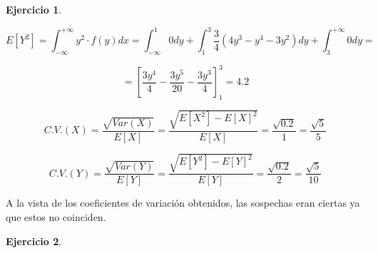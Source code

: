 \documentclass[a4paper, 12pt]{article}
\theoremstyle{definition}
\newtheorem{ej}{Ejercicio}
\begin{document}
\begin{ej}
\begin{enumerate}
    \begin{equation*}
        E[Y^2] = \int_{-\infty}^{+\infty}y^2 \cdot f(y)dx = \int_{-\infty}^{1}0dy + \int_{1}^{3}\frac{3}{4} (4y^3-y^4-3y^2)dy + \int_{3}^{+\infty}0dy =
    \end{equation*}
    
    \begin{equation*}
        = \left[\frac{3y^4}{4}-\frac{3y^5}{20}-\frac{3y^3}{4}\right]^{3}_{1} = 4.2
    \end{equation*}
    
    \begin{equation*}
        C.V.(X)=\frac{\sqrt{Var(X)}}{E[X]} = \frac{\sqrt{E[X^2]-E[X]^2}}{E[X]} = \frac{\sqrt{0.2}}{1} = \frac{\sqrt{5}}{5}
    \end{equation*}
    
    \begin{equation*}
        C.V.(Y)=\frac{\sqrt{Var(Y)}}{E[Y]} = \frac{\sqrt{E[Y^2]-E[Y]^2}}{E[Y]} = \frac{\sqrt{0.2}}{2} = \frac{\sqrt{5}}{10}
    \end{equation*}

A la vista de los coeficientes de variación obtenidos, las sospechas eran ciertas ya que estos no coinciden.
\end{enumerate}
\end{ej}

\begin{ej}
	
\end{ej}
\end{document}
